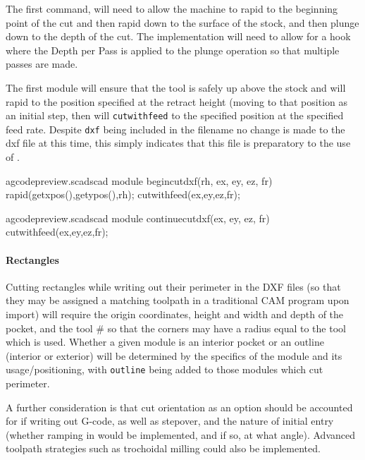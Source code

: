 \documentclass{ltxdoc}
\begin{document}
The first command,  will need to allow the machine to rapid to the beginning point of the cut and then rapid down to the surface of the stock, and then plunge down to the depth of the cut. The implementation will need to allow for a hook where the Depth per Pass is applied to the plunge operation so that multiple passes are made.

The first module will ensure that the tool is safely up above the stock and will rapid to the position specified at the retract height (moving to that position as an initial step, then will \texttt{cutwithfeed} to the specified position at the specified feed rate. Despite \texttt{dxf} being included in the filename no change is made to the dxf file at this time, this simply indicates that this file is preparatory to the use of .

\lstset{firstnumber=\thegcpscad}
\begin{writecode}{a}{gcodepreview.scad}{scad}
module begincutdxf(rh, ex, ey, ez, fr) {
  rapid(getxpos(),getypos(),rh);
  cutwithfeed(ex,ey,ez,fr);
}

\end{writecode}
\addtocounter{gcpscad}{5}
 
\lstset{firstnumber=\thegcpscad}
\begin{writecode}{a}{gcodepreview.scad}{scad}
module continuecutdxf(ex, ey, ez, fr) {
  cutwithfeed(ex,ey,ez,fr);
}

\end{writecode}
\addtocounter{gcpscad}{4}

\paragraph{Rectangles}

Cutting rectangles while writing out their perimeter in the DXF files (so that they may be assigned a matching toolpath in a traditional CAM program upon import) will require the origin coordinates, height and width and depth of the pocket, and the tool \# so that the corners may have a radius equal to the tool which is used. Whether a given module is an interior pocket or an outline (interior or exterior) will be determined by the specifics of the module and its usage/positioning, with \texttt{outline} being added to those modules which cut perimeter.

A further consideration is that cut orientation as an option should be accounted for if writing out G-code, as well as stepover, and the nature of initial entry (whether ramping in would be implemented, and if so, at what angle). Advanced toolpath strategies such as trochoidal milling could also be implemented.
\end{document}

